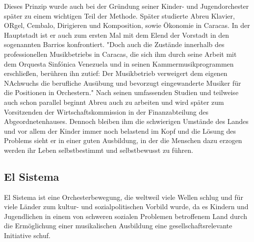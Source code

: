 Dieses Prinzip wurde auch bei der Gründung seiner Kinder- und Jugendorchester
später zu einem wichtigen Teil der Methode. Später studierte Abreu Klavier,
ORgel, Cembalo, Dirigieren
und Komposition, sowie Ökonomie in Caracas. In der
Hauptstadt ist er auch zum ersten Mal mit dem Elend der Vorstadt in den
sogenannten Barrios konfrontiert. "Doch auch die Zustände innerhalb des
professionellen Musikbetriebs in Caracas, die sich ihm durch seine Arbeit mit
dem Orquesta Sinfónica Venezuela und in seinen Kammermusikprogrammen
erschließen, berühren ihn zutief: Der Musikbetrieb verweigert dem eigenen
NAchwuchs die berufliche Ausübung und bevorzugt eingewanderte Musiker für die
Positionen in Orchestern."\autocite[28]{kaufmann:el_sistema} Nach seinen
umfassenden Studien und teilweise auch schon parallel beginnt Abreu auch zu
arbeiten und wird später zum Vorsitzenden der Wirtschaftskommission in der
Finanzabteilung des Abgeordnetenhauses. Dennoch bleiben ihm die schwierigen
Umstände des Landes und vor allem der Kinder immer noch belastend im Kopf und
die Lösung des Problems sieht er in einer guten Ausbildung, in der die Menschen
dazu erzogen werden ihr Leben selbstbestimmt und selbstbewusst zu führen.\autocite[31]{kaufmann:el_sistema} 



\subsection{El Sistema}
El Sistema ist eine Orchesterbewegung,
die weltweil viele Wellen schlug und für viele Länder zum kultur- und
sozialpolitischen Vorbild wurde, da es Kindern und Jugendlichen in einem von
schweren sozialen Problemen betroffenem Land durch die Ermöglichung einer
musikalischen Ausbildung eine gesellschaftsrelevante
Initiative schuf. 


